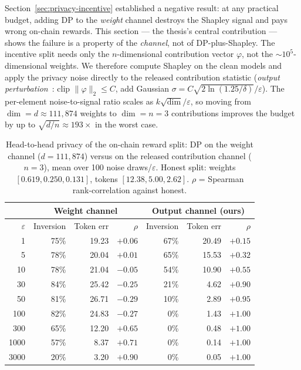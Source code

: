 Section~\ref{sec:privacy-incentive} established a negative result: at any practical budget, adding DP to the \emph{weight} channel destroys the Shapley signal and pays wrong on-chain rewards. This section --- the thesis's central contribution --- shows the failure is a property of the \emph{channel}, not of DP-plus-Shapley. The incentive split needs only the $n$-dimensional contribution vector $\varphi$, not the $\sim$$10^5$-dimensional weights. We therefore compute Shapley on the clean models and apply the privacy noise directly to the released contribution statistic (\emph{output perturbation}~\cite{chaudhuri2011}: clip $\lVert\varphi\rVert_2\le C$, add Gaussian $\sigma=C\sqrt{2\ln(1.25/\delta)}/\varepsilon$). The per-element noise-to-signal ratio scales as $k\sqrt{\dim}/\varepsilon$, so moving from $\dim=d\approx 111{,}874$ weights to $\dim=n=3$ contributions improves the budget by up to $\sqrt{d/n}\approx 193\times$ in the worst case.

\begin{table}[H]
\centering
\caption{Head-to-head privacy of the on-chain reward split: DP on the weight channel ($d=111{,}874$) versus on the released contribution channel ($n=3$), mean over 100 noise draws/$\varepsilon$. Honest split: weights $[0.619,0.250,0.131]$, tokens $[12.38,5.00,2.62]$. $\rho$ = Spearman rank-correlation against honest.}
\label{tab:private_incentive}
\begin{tabular}{|r|r|r|r|r|r|r|}
\hline
& \multicolumn{3}{c|}{\textbf{Weight channel}} & \multicolumn{3}{c|}{\textbf{Output channel (ours)}} \\ \hline
$\varepsilon$ & Inversion & Token err & $\rho$ & Inversion & Token err & $\rho$ \\ \hline
1    & 75\% & 19.23 & $+0.06$ & 67\% & 20.49 & $+0.15$ \\ \hline
5    & 78\% & 20.04 & $+0.01$ & 65\% & 15.53 & $+0.32$ \\ \hline
10   & 78\% & 21.04 & $-0.05$ & 54\% & 10.90 & $+0.55$ \\ \hline
30   & 84\% & 25.42 & $-0.25$ & 21\% & 4.62  & $+0.90$ \\ \hline
50   & 81\% & 26.71 & $-0.29$ & 10\% & 2.89  & $+0.95$ \\ \hline
100  & 82\% & 24.83 & $-0.27$ & 0\%  & 1.43  & $+1.00$ \\ \hline
300  & 65\% & 12.20 & $+0.65$ & 0\%  & 0.48  & $+1.00$ \\ \hline
1000 & 57\% & 8.37  & $+0.71$ & 0\%  & 0.14  & $+1.00$ \\ \hline
3000 & 20\% & 3.20  & $+0.90$ & 0\%  & 0.05  & $+1.00$ \\ \hline
\end{tabular}
\end{table}

